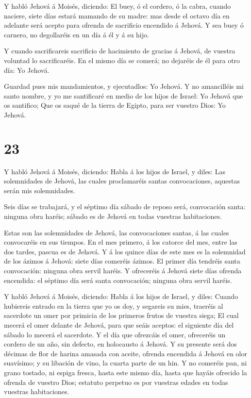  Y habló Jehová á Moisés, diciendo:  El buey,
ó el cordero, ó la cabra, cuando naciere, siete días estará mamando de
su madre: mas desde el octavo día en adelante será acepto para ofrenda
de sacrificio encendido á Jehová.  Y sea buey ó carnero, no
degollaréis en un día á él y á su hijo.

 Y cuando sacrificareis sacrificio de hacimiento de gracias
á Jehová, de vuestra voluntad lo sacrificaréis.  En el
mismo día se comerá; no dejaréis de él para otro día: Yo Jehová.

 Guardad pues mis mandamientos, y ejecutadlos: Yo Jehová.
 Y no amancilléis mi santo nombre, y yo me santificaré en
medio de los hijos de Israel: Yo Jehová que os santifico; 
Que os saqué de la tierra de Egipto, para ser vuestro Dios: Yo Jehová.

\hypertarget{section-22}{%
\section{23}\label{section-22}}

 Y habló Jehová á Moisés, diciendo:  Habla á los
hijos de Israel, y diles: Las solemnidades de Jehová, las cuales
proclamaréis santas convocaciones, aquestas serán mis solemnidades.

 Seis días se trabajará, y el séptimo día sábado de reposo
será, convocación santa: ninguna obra haréis; sábado es de Jehová en
todas vuestras habitaciones.

 Estas son las solemnidades de Jehová, las convocaciones
santas, á las cuales convocaréis en sus tiempos.  En el mes
primero, á los catorce del mes, entre las dos tardes, pascua es de
Jehová.  Y á los quince días de este mes es la solemnidad de
los ázimos á Jehová: siete días comeréis ázimos.  El primer
día tendréis santa convocación: ninguna obra servil haréis. 
Y ofreceréis á Jehová siete días ofrenda encendida: el séptimo día será
santa convocación; ninguna obra servil haréis.

 Y habló Jehová á Moisés, diciendo:  Habla á
los hijos de Israel, y diles: Cuando hubiereis entrado en la tierra que
yo os doy, y segareis su mies, traeréis al sacerdote un omer por
primicia de los primeros frutos de vuestra siega;  El cual
mecerá el omer delante de Jehová, para que seáis aceptos: el siguiente
día del sábado lo mecerá el sacerdote.  Y el día que
ofrezcáis el omer, ofreceréis un cordero de un año, sin defecto, en
holocausto á Jehová.  Y su presente será dos décimas de
flor de harina amasada con aceite, ofrenda encendida á Jehová en olor
suavísimo; y su libación de vino, la cuarta parte de un hin.
 Y no comeréis pan, ni grano tostado, ni espiga fresca,
hasta este mismo día, hasta que hayáis ofrecido la ofrenda de vuestro
Dios; estatuto perpetuo es por vuestras edades en todas vuestras
habitaciones.

